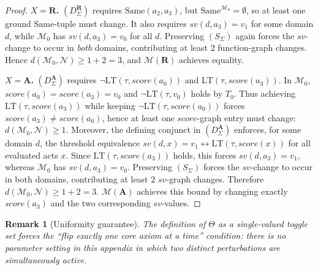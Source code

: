 \documentclass[12pt]{article}
\newtheorem{remark}{Remark}
\begin{document}
\begin{proof}
\textbf{$X=\mathbf{R}$.}
$(D^{\mathbf{R}}_\Sigma)$ requires $\mathrm{Same}(a_2,a_3)$, but $\mathrm{Same}^{\mathcal{M}_0}=\emptyset$, so at least one ground $\mathrm{Same}$-tuple must change.
It also requires $sv(d,a_3)=v_1$ for some domain $d$, while $\mathcal{M}_0$ has $sv(d,a_3)=v_0$ for all $d$.
Preserving $(S_\Sigma)$ again forces the $sv$-change to occur in \emph{both} domains, contributing at least $2$ function-graph changes.
Hence $d(\mathcal{M}_0,\mathcal{N})\ge 1+2=3$, and $\mathcal{M}(\mathbf{R})$ achieves equality.

\textbf{$X=\mathbf{A}$.}
$(D^{\mathbf{A}}_\Sigma)$ requires $\neg\mathrm{LT}(\tau,score(a_0))$ and $\mathrm{LT}(\tau,score(a_3))$.
In $\mathcal{M}_0$, $score(a_0)=score(a_3)=v_0$ and $\neg\mathrm{LT}(\tau,v_0)$ holds by $T_0$.
Thus achieving $\mathrm{LT}(\tau,score(a_3))$ while keeping $\neg\mathrm{LT}(\tau,score(a_0))$ forces $score(a_3)\neq score(a_0)$,
hence at least one $score$-graph entry must change: $d(\mathcal{M}_0,\mathcal{N})\ge 1$.
Moreover, the defining conjunct in $(D^{\mathbf{A}}_\Sigma)$ enforces, for some domain $d$, the threshold equivalence
$sv(d,x)=v_1\leftrightarrow \mathrm{LT}(\tau,score(x))$ for all evaluated acts $x$.
Since $\mathrm{LT}(\tau,score(a_3))$ holds, this forces $sv(d,a_3)=v_1$, whereas $\mathcal{M}_0$ has $sv(d,a_3)=v_0$.
Preserving $(S_\Sigma)$ forces the $sv$-change to occur in both domains, contributing at least $2$ $sv$-graph changes.
Therefore $d(\mathcal{M}_0,\mathcal{N})\ge 1+2=3$.
$\mathcal{M}(\mathbf{A})$ achieves this bound by changing exactly $score(a_3)$ and the two corresponding $sv$-values.
\end{proof}


\begin{remark}[Uniformity guarantee]
The definition of $\Theta$ as a \emph{single-valued} toggle set forces the ``flip exactly one core axiom at a time'' condition:
there is no parameter setting in this appendix in which two distinct perturbations are simultaneously active.
\end{remark}
\end{document}
